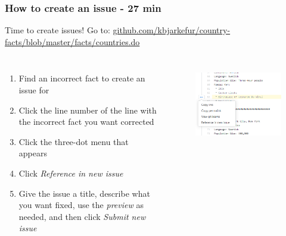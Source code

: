 \documentclass[aspectratio=169]{beamer} %
\newcommand{\trainingURL}[1]{{\color{blue}\url{#1}}}
\newcommand{\traininerUsername}{kbjarkefur}
\newcommand{\repoName}{\traininerUsername/country-facts}
\newcommand{\trainingRepoURL}[1]{\trainingURL{github.com/\repoName #1}}
\begin{document}
\begin{frame}
	\frametitle{How to create an issue - 27 min}
	
	Time to create issues! Go to: \trainingRepoURL{/blob/master/facts/countries.do}	
	\vspace{.5cm}

	\begin{columns}[c] 
	
		\begin{enumerate}
			\item Find an incorrect fact to create an issue for
			\item Click the line number of the line with the incorrect fact you want corrected
			\item Click the three-dot menu that appears
			\item Click \textit{Reference in new issue}
			\item Give the issue a title, describe what you want fixed, use the \textit{preview} as needed, and then click \textit{Submit new issue}
		\end{enumerate}	
	
		\begin{figure}
			\centering
			\includegraphics[width=1\linewidth]{img/reference-code-line-issue.png}
			\label{fig:branches}
		\end{figure}
	\end{columns}
\end{frame}
\end{document}
